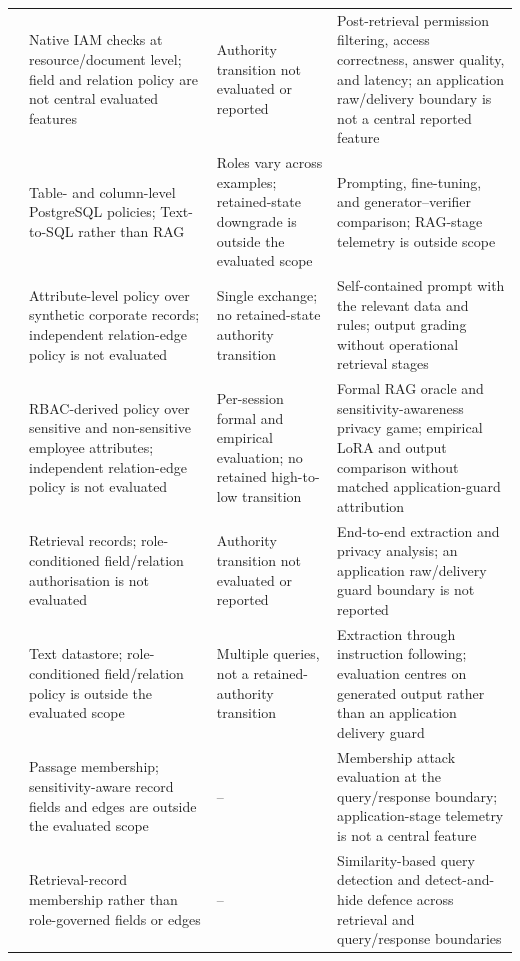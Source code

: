 {\begin{longtable}{@{}>{\raggedright\arraybackslash}p{22mm}>{\raggedright\arraybackslash}p{39mm}>{\raggedright\arraybackslash}p{35mm}>{\raggedright\arraybackslash}p{40mm}@{}}
\citet{jeong2025permissionrag} & Native IAM checks at resource/document level; field and relation policy are not central evaluated features & Authority transition not evaluated or reported & Post-retrieval permission filtering, access correctness, answer quality, and latency; an application raw/delivery boundary is not a central reported feature \\
\addlinespace[1.5pt]
\citet{klisura2026role} & Table- and column-level PostgreSQL policies; Text-to-SQL rather than RAG & Roles vary across examples; retained-state downgrade is outside the evaluated scope & Prompting, fine-tuning, and generator--verifier comparison; RAG-stage telemetry is outside scope \\
\addlinespace[1.5pt]
\citet{fazlija2025accessdenied} & Attribute-level policy over synthetic corporate records; independent relation-edge policy is not evaluated & Single exchange; no retained-state authority transition & Self-contained prompt with the relevant data and rules; output grading without operational retrieval stages \\
\addlinespace[1.5pt]
\citet{fazlija2026sensitivity} & RBAC-derived policy over sensitive and non-sensitive employee attributes; independent relation-edge policy is not evaluated & Per-session formal and empirical evaluation; no retained high-to-low transition & Formal RAG oracle and sensitivity-awareness privacy game; empirical LoRA and output comparison without matched application-guard attribution \\
\addlinespace[1.5pt]
\citet{zeng2024ragprivacy} & Retrieval records; role-conditioned field/relation authorisation is not evaluated & Authority transition not evaluated or reported & End-to-end extraction and privacy analysis; an application raw/delivery guard boundary is not reported \\
\addlinespace[1.5pt]
\citet{qi2025spill} & Text datastore; role-conditioned field/relation policy is outside the evaluated scope & Multiple queries, not a retained-authority transition & Extraction through instruction following; evaluation centres on generated output rather than an application delivery guard \\
\addlinespace[1.5pt]
\citet{anderson2025ragmia} & Passage membership; sensitivity-aware record fields and edges are outside the evaluated scope & -- & Membership attack evaluation at the query/response boundary; application-stage telemetry is not a central feature \\
\addlinespace[1.5pt]
\citet{choi2025safeguarding} & Retrieval-record membership rather than role-governed fields or edges & -- & Similarity-based query detection and detect-and-hide defence across retrieval and query/response boundaries \\

\end{longtable}}
